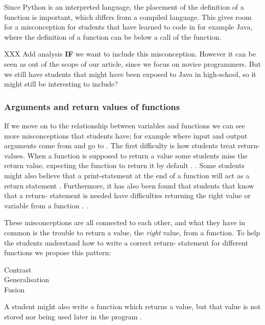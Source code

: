 Since Python is an interpreted language, the placement of the definition of 
a function is important, which differs from a compiled language. This gives 
room for a misconception for students that have learned to code in for 
example Java, where the definition of a function can be below a call of the 
function. 

XXX Add analysis \textbf{IF} we want to include this misconception. However 
it can be seen as out of the scope of our article, since we focus on novice 
programmers. But we still have students that might have been exposed to 
Java in high-school, so it might still be interesting to include?

\subsubsection{Arguments and return values of functions}

If we move on to the relationship between variables and functions we can see 
more misconceptions that students have; for example where input and output 
arguments 
come from and go to \parencite{Ragonis2005OOP}.
The first difficulty is how students treat return-values. When a function is 
supposed to return a value some students miss the return value, expecting 
the 
function to return it by default \parencite{Kurvinen2016,KumarVeerasamy2016}
. 
. Some students might also believe that a print-statement at the end of a 
function will act as a return statement \parencite{MisconceptionsSurvey2017}
. Furthermore, it has also been found that students that know that a return-
statement is needed have difficulties 
returning the right value or variable from a function
\parencite{KumarVeerasamy2016}. 
. 

These misconceptions are all connected to each other, and what they have in 
common is the trouble to return a value, the \emph{right} value, from a 
function. To help the students understand how to write a correct return-
statement for different functions we propose this pattern:


\begin{description}
    \item[Contrast]
    \item[Generalisation]
    \item[Fusion]
\end{description}


A student might also write a function which returns a value, but that value 
is 
not stored nor being used later in the program 
\parencite{AltadmriBrown2015}.


